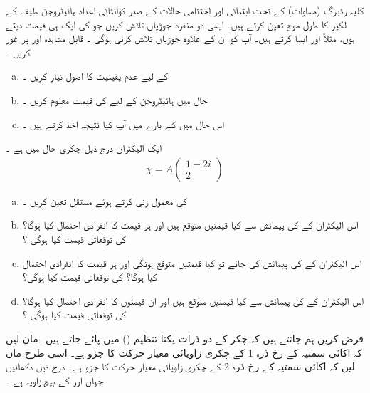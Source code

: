  کلیہ رڈبرگ (مساوات) کے تحت ابتدائی اور اختتامی حالات کے صدر کوانٹائی اعداد ہائیڈروجن   طیف  کے لکیر کا طول موج تعین کرتے ہیں۔ ایسی دو منفرد
  جوڑیاں  تلاش کریں جو  کی ایک ہی قیمت دیتے ہوں،  مثلاً   اور  ایسا کرتے ہیں۔ آپ کو ان کے علاوہ جوڑیاں تلاش کرنی ہوگی ۔
قابل مشاہدہ   اور  پر غور کریں ۔
\begin{enumerate}[a.]
\item
{} کے لیے عدم یقینیت کا اصول تیار کریں ۔
\item
حال  میں ہائیڈروجن کے لیے  کی قیمت معلوم کریں ۔
\item
اس حال میں  کے بارے میں آپ کیا نتیجہ اخذ کرتے ہیں ۔
\end{enumerate}
ایک الیکٹران درج ذیل چکری حال میں ہے ۔
\begin{align*}
\chi = A
\begin{pmatrix}
1 - 2i \\
2
\end{pmatrix}
\end{align*}
\begin{enumerate}[a.]
\item
{} کی معمول زنی کرتے   ہوئے مستقل  تعین کریں ۔
\item
اس الیکٹران کے   کی پیمائش سے کیا قیمتیں متوقع ہیں اور ہر قیمت کا انفرادی احتمال کیا ہوگا؟   کی توقعاتی قیمت کیا ہوگی ؟
\item
 اس الیکٹران کے  کی پیمائش کی جائے تو کیا  قیمتیں  متوقع ہونگی اور ہر قیمت کا انفرادی احتمال کیا ہوگا؟  کی توقعاتی قیمت کیا ہوگی؟ 
\item
اس الیکٹران کے   کی پیمائش سے کیا  قیمتیں  متوقع ہیں اور ان قیمتوں کا انفرادی احتمال کیا ہوگا؟   کی توقعاتی قیمت کیا ہوگی ؟
\end{enumerate}
 
فرض کریں  ہم جانتے ہیں کہ   چکر کے دو  ذرات یکتا تنظیم   () میں پائے جاتے ہیں ۔مان لیں کہ اکائی سمتیہ    کے رخ ذرہ 1 کے چکری زاویائی معیار حرکت کا جزو   ہے۔ اسی طرح مان لیں کہ اکائی سمتیہ    کے رخ ذرہ 2 کے چکری زاویائی معیار حرکت کا جزو   ہے۔ درج ذیل دکھائیں جہاں  اور  کے بیچ زاویہ  ہے ۔
